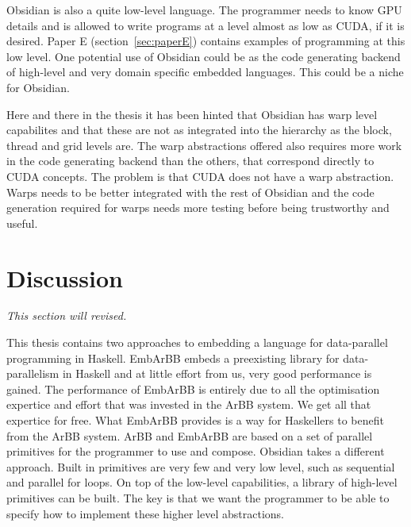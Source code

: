 \documentclass[a4paper]{book}
\begin{document}
Obsidian is also a quite low-level language. The programmer needs to know GPU details 
and is allowed to write programs at a level almost as low as CUDA, if it is desired. 
Paper E (section~\ref{sec:paperE}) contains examples of programming at this low level. 
One potential use of Obsidian could be as the code generating backend of high-level 
and very domain specific embedded languages. This could be a niche for Obsidian.  

Here and there in the thesis it has been hinted that Obsidian has warp level 
capabilites and that these are not as integrated into the hierarchy as the block, 
thread and grid levels are. The warp abstractions offered also requires more work in 
the code generating backend than the others, that correspond directly to CUDA concepts. 
The problem is that CUDA does not have a warp abstraction. Warps needs to be 
better integrated with the rest of Obsidian and the code generation required 
for warps needs more testing before being trustworthy and useful. 



%
%

\section{Discussion} 

\vspace{5mm} 

\emph{This section will revised.} 

\vspace{5mm}

This thesis contains two approaches to embedding a language for data-parallel programming 
in Haskell. EmbArBB embeds a preexisting library for data-parallelism in Haskell 
and at little effort from us, very good performance is gained. The performance of 
EmbArBB is entirely due to all the optimisation expertice and effort that was invested in 
the ArBB system. We get all that expertice for free. What EmbArBB provides is a 
way for Haskellers to benefit from the ArBB system. ArBB and EmbArBB are based on a 
set of parallel primitives for the programmer to use and compose. Obsidian takes 
a different approach. Built in primitives are very few and very low level, such as 
sequential and parallel for loops. On top of the low-level capabilities, a library 
of high-level primitives can be built. The key is that we want the programmer to 
be able to specify how to implement these higher level abstractions. 
\end{document}
